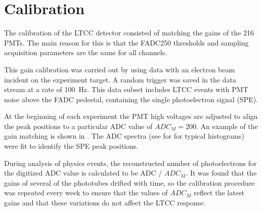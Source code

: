 \section{Calibration}

The calibration of the LTCC detector consisted of matching the gains of the 216 PMTs. The main reason for this
is that the FADC250 thresholds and sampling acquisition parameters are the same for all channels.

This gain calibration was carried out by using data with an electron beam incident on the experiment target. A
random trigger was saved in the data stream at a rate of 100~Hz. This data subset includes LTCC events with
PMT noise above the FADC pedestal, containing the single photoelectron signal (SPE).

At the beginning of each experiment the PMT high voltages are adjusted to align the peak positions to a particular
ADC value of $ADC_M = 200$. An example of the gain matching is shown in . The ADC spectra
(see for  for typical histograms) were fit to identify the SPE peak positions.

During analysis of physics events, the reconstructed number of photoelectrons for the digitized ADC value is
calculated to be ADC / $ADC_M$. It was found that the gains of several of the phototubes drifted with time, so
the calibration procedure was repeated every week to ensure that the values of $ADC_M$ reflect the latest
gains and that these variations do not affect the LTCC response.

